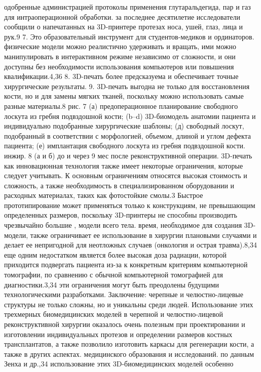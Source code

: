 одобренные администрацией протоколы применения глутаральдегида, пар и газ для
интраоперационной обработки. за последнее десятилетие исследователи сообщили о
напечатанных на 3D-принтере протезах носа, ушей, глаз, лица и рук.9 7. Это
образовательный инструмент для студентов-медиков и ординаторов. физические
модели можно реалистично удерживать и вращать, ими можно манипулировать в
интерактивном режиме независимо от сложности, и они доступны без необходимости
использования компьютеров или повышения квалификации.4,36 8. 3D-печать более
предсказуема и обеспечивает точные хирургические результаты. 9. 3D-печать
выгодна не только для восстановления кости, но и для замены мягких тканей,
поскольку можно использовать самые разные материалы.8 рис. 7 (а)
предоперационное планирование свободного лоскута из гребня подвздошной кости;
(b–d) 3D-биомодель анатомии пациента и индивидуально подобранные хирургические
шаблоны; (д) свободный лоскут, подобранный в соответствии с морфологией,
объемом, длиной и углом дефекта пациента; (е) имплантация свободного лоскута из
гребня подвздошной кости. инжир. 8 (а и б) до и через 9 мес после
реконструктивной операции. 3D-печать как инновационная технология также имеет
некоторые ограничения, которые следует учитывать. К основным ограничениям
относятся высокая стоимость и сложность, а также необходимость в
специализированном оборудовании и расходных материалах, таких как фотостойкие
смолы.3 Быстрое прототипирование может применяться только к конструкциям, не
превышающим определенных размеров, поскольку 3D-принтеры не способны производить
чрезвычайно большие , модели всего тела. время, необходимое для создания
3D-модели, также ограничивает ее использование в хирургии плановыми случаями и
делает ее непригодной для неотложных случаев (онкология и острая травма).8,34
еще одним недостатком является более высокая доза радиации, которой приходится
подвергать пациента из-за к конкретным критериям компьютерной томографии, по
сравнению с обычной компьютерной томографией для диагностики.3,34 эти
ограничения могут быть преодолены будущими технологическими разработками.
Заключение: черепные и челюстно-лицевые структуры не только сложны, но и
уникальны среди людей. Использование этих трехмерных биомедицинских моделей в
черепной и челюстно-лицевой реконструктивной хирургии оказалось очень полезным
при проектировании и изготовлении индивидуальных протезов и определении размеров
костных трансплантатов, а также позволило изготовить каркасы для регенерации
кости, а также в других аспектах. медицинского образования и исследований. по
данным Зенха и др.,34 использование этих 3D-биомедицинских моделей особенно
